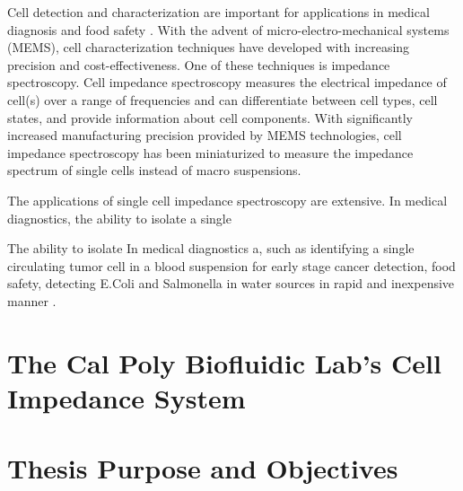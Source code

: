 \par Cell detection and characterization are important for applications in medical diagnosis and food safety \cite{mansor}. With the advent of micro-electro-mechanical systems (MEMS), cell characterization techniques have developed with increasing precision and cost-effectiveness. One of these techniques is impedance spectroscopy. Cell impedance spectroscopy measures the electrical impedance of cell(s) over a range of frequencies and can differentiate between cell types, cell states, and provide information about cell components. With significantly increased manufacturing precision provided by MEMS technologies, cell impedance spectroscopy has been miniaturized to measure the impedance spectrum of single cells instead of macro suspensions. 

\par The applications of single cell impedance spectroscopy are extensive. In medical diagnostics, the ability to isolate a single

The ability to isolate In medical diagnostics a, such as identifying a single circulating tumor cell in a blood suspension for early stage cancer detection\cite{Mansor-1}, food safety, detecting E.Coli and Salmonella in water sources in rapid and inexpensive manner \cite{Mansor-3}.

\section{The Cal Poly Biofluidic Lab's Cell Impedance System}

\section{Thesis Purpose and Objectives}